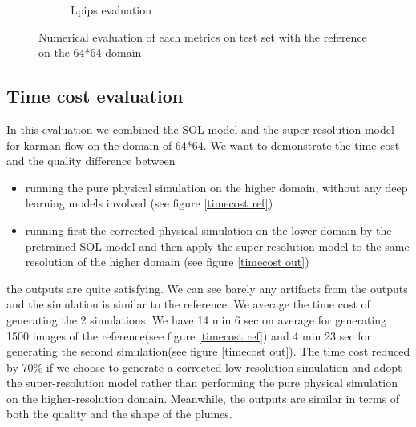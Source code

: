 \documentclass[a4paper,12pt,twoside]{report}
\begin{document}
\begin{figure}
\begin{subfigure}{0.32\textwidth}
			\caption{Lpips evaluation}
		\end{subfigure}
		\caption{Numerical evaluation of each metrics on test set with the reference on the 64*64 domain}
		\label{sol buoyancy low numeval}
	\end{figure}

\subsection{Time cost evaluation}
In this evaluation we combined the SOL model and the super-resolution model for karman flow on the domain of 64*64. We want to demonstrate the time cost and the quality difference between
\begin{itemize}
	\item running  the pure physical simulation on the higher domain, without any deep learning models involved (see figure \ref{timecost ref})
	\item running first the corrected physical simulation on the lower domain by the pretrained SOL model and then apply the super-resolution model to the same resolution of the higher domain (see figure \ref{timecost out})
\end{itemize}
the outputs are quite satisfying. We can see barely any artifacts from the outputs and the simulation is similar to the reference. We average the time cost of generating the 2 simulations. We have 14 min 6 sec on average for generating 1500 images of the reference(see figure \ref{timecost ref}) and 4 min 23 sec for generating the second simulation(see figure \ref{timecost out}). The time cost reduced by 70\% if we choose to generate a corrected low-resolution simulation and adopt the super-resolution model rather than performing the pure physical simulation on the higher-resolution domain. Meanwhile, the outputs are similar in terms of both the quality and the shape of the plumes.  
\end{document}
